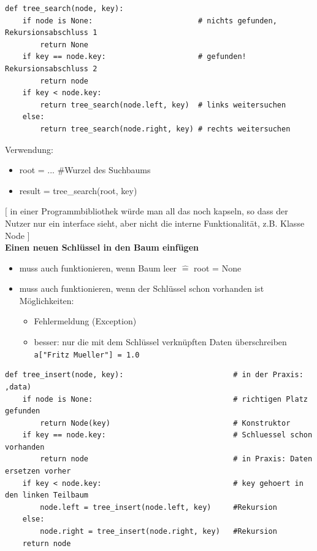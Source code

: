 \begin{verbatim}
def tree_search(node, key):
    if node is None:                        # nichts gefunden, Rekursionsabschluss 1
        return None
    if key == node.key:                     # gefunden! Rekursionsabschluss 2
        return node
    if key < node.key:
        return tree_search(node.left, key)  # links weitersuchen
    else:
        return tree_search(node.right, key) # rechts weitersuchen
\end{verbatim}

Verwendung:
\begin{itemize}[label ={}]
    \item root = ...    \hspace*{1cm} \#Wurzel des Suchbaums
    \item result = tree\_search(root, key)
\end{itemize}
$[$ in einer Programmbibliothek würde man all das noch \glqq kapseln\grqq , so dass der Nutzer nur ein interface sieht, aber nicht die interne Funktionalität, z.B. Klasse Node $]$ \\

\textbf{Einen neuen Schlüssel in den Baum einfügen}
\begin{itemize}
    \item muss auch funktionieren, wenn Baum leer $\widehat{=}$ root = None
    \item muss auch funktionieren, wenn der Schlüssel schon vorhanden ist \\
    Möglichkeiten:
    \begin{itemize}
        \item Fehlermeldung (Exception)
        \item besser: nur die mit dem Schlüssel verknüpften Daten überschreiben \verb|a["Fritz Mueller"] = 1.0|
    \end{itemize}
\end{itemize}

\begin{verbatim}
def tree_insert(node, key):                         # in der Praxis: ,data)
    if node is None:                                # richtigen Platz gefunden
        return Node(key)                            # Konstruktor
    if key == node.key:                             # Schluessel schon vorhanden
        return node                                 # in Praxis: Daten ersetzen vorher
    if key < node.key:                              # key gehoert in den linken Teilbaum
        node.left = tree_insert(node.left, key)     #Rekursion
    else:
        node.right = tree_insert(node.right, key)   #Rekursion
    return node
\end{verbatim}

